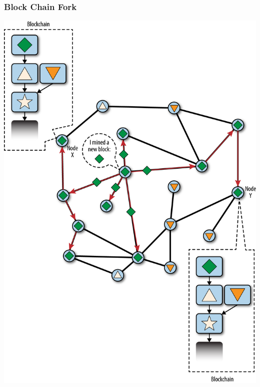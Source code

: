 \begin{frame}
    \frametitle{Block Chain Fork}
    \includegraphics[scale=0.5]{./figures/mbc2_1005.png}
\end{frame}

